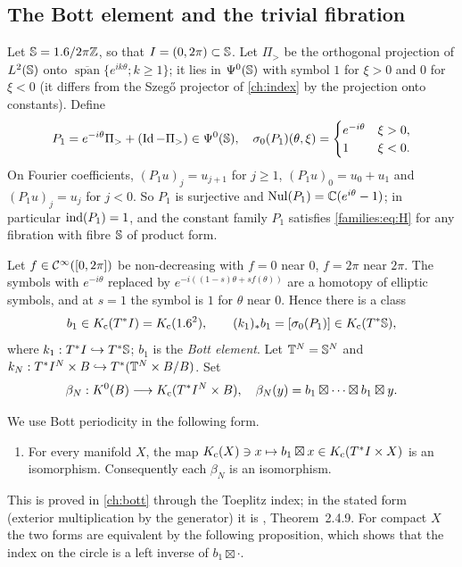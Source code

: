 \subsection{The Bott element and the trivial fibration}
Let $\mathbb{S}=1.6/2\pi\mathbb{Z}$, so that $I=(0,2\pi)\subset\mathbb{S}$. Let $\Pi_>$ be the
orthogonal projection of $L^2(\mathbb{S})$ onto $\overline{\operatorname{span}}
\{e^{ik\theta};k\ge1\}$; it lies in $\Psi^{0}(\mathbb{S})$ with symbol $1$ for
$\xi>0$ and $0$ for $\xi<0$ (it differs from the Szeg\H{o} projector of
\cref{ch:index} by the projection onto constants). Define
\begin{equation}\label{families:eq:P1}
  P_1=e^{-i\theta}\Pi_>+(\operatorname{Id}-\Pi_>)\in\Psi^{0}(\mathbb{S}),\quad
  \sigma_0(P_1)(\theta,\xi)=\begin{cases}e^{-i\theta}&\xi>0,\\1&\xi<0.
  \end{cases}
\end{equation}
On Fourier coefficients, $(P_1u)_j=u_{j+1}$ for $j\ge1$, $(P_1u)_0=u_0+u_1$
and $(P_1u)_j=u_j$ for $j<0$. So $P_1$ is surjective and
$\operatorname{Nul}(P_1)=\mathbb{C}(e^{i\theta}-1)$; in particular $\operatorname{ind}(P_1)=1$, and the constant
family $P_1$ satisfies \eqref{families:eq:H} for any fibration with fibre
$\mathbb{S}$ of product form.

Let $f\in\mathcal{C}^\infty([0,2\pi])$ be non-decreasing with $f=0$ near $0$, $f=2\pi$ near
$2\pi$. The symbols with $e^{-i\theta}$ replaced by
$e^{-i((1-s)\theta+sf(\theta))}$ are a homotopy of elliptic symbols, and at
$s=1$ the symbol is $1$ for $\theta$ near $0$. Hence there is a class
\begin{equation*}
  b_1\in K_{\mathrm{c}}(T^*I)=K_{\mathrm{c}}(1.6^2),\qquad(k_1)_*b_1=[\sigma_0(P_1)]\in
  K_{\mathrm{c}}(T^*\mathbb{S}),
\end{equation*}
where $k_1:T^*I\hookrightarrow T^*\mathbb{S}$; $b_1$ is the \emph{Bott element}.
Let $\mathbb{T}^N=\mathbb{S}^N$ and $k_N:T^*I^N\times B\hookrightarrow
T^*(\mathbb{T}^N\times B/B)$. Set
\begin{equation*}
  \beta_N:K^0(B)\longrightarrow K_{\mathrm{c}}(T^*I^N\times B),\quad\beta_N(y)=b_1
  \boxtimes\cdots\boxtimes b_1\boxtimes y.
\end{equation*}

We use Bott periodicity in the following form.
\begin{enumerate}[label=(BP)]
\item\label{families:BP} For every manifold $X$, the map
  $K_{\mathrm{c}}(X)\ni x\mapsto b_1\boxtimes x\in K_{\mathrm{c}}(T^*I\times X)$ is an isomorphism.
  Consequently each $\beta_N$ is an isomorphism.
\end{enumerate}
This is proved in \cref{ch:bott} through the Toeplitz index; in the stated
form (exterior multiplication by the generator) it is \cite{Atiyah-K},
Theorem~2.4.9. For compact $X$ the two forms are equivalent by the following
proposition, which shows that the index on the circle is a left inverse of
$b_1\boxtimes\cdot$.

